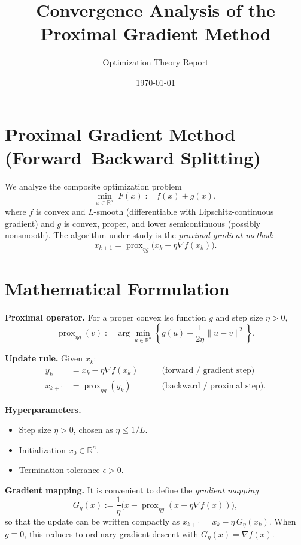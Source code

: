 \documentclass[11pt]{article}
\title{Convergence Analysis of the Proximal Gradient Method}
\author{Optimization Theory Report}
\date{\today}
\begin{document}
\maketitle

\section*{Proximal Gradient Method (Forward--Backward Splitting)}

We analyze the composite optimization problem
\[
\min_{x \in \mathbb{R}^n} \; F(x) := f(x) + g(x),
\]
where $f$ is convex and $L$-smooth (differentiable with Lipschitz-continuous gradient) and $g$ is convex, proper, and lower semicontinuous (possibly nonsmooth). The algorithm under study is the \emph{proximal gradient method}:
\[
x_{k+1} = \operatorname{prox}_{\eta g}\bigl(x_k - \eta \nabla f(x_k)\bigr).
\]

\section*{Mathematical Formulation}

\textbf{Proximal operator.} For a proper convex lsc function $g$ and step size $\eta > 0$,
\[
\operatorname{prox}_{\eta g}(v) := \arg\min_{u \in \mathbb{R}^n} \left\{ g(u) + \frac{1}{2\eta}\|u - v\|^2 \right\}.
\]

\textbf{Update rule.} Given $x_k$:
\begin{align}
y_k &= x_k - \eta \nabla f(x_k) \qquad &\text{(forward / gradient step)}\\
x_{k+1} &= \operatorname{prox}_{\eta g}(y_k) \qquad &\text{(backward / proximal step)}.
\end{align}

\textbf{Hyperparameters.}
\begin{itemize}
\item Step size $\eta > 0$, chosen as $\eta \le 1/L$.
\item Initialization $x_0 \in \mathbb{R}^n$.
\item Termination tolerance $\epsilon > 0$.
\end{itemize}

\textbf{Gradient mapping.} It is convenient to define the \emph{gradient mapping}
\[
G_\eta(x) := \frac{1}{\eta}\bigl(x - \operatorname{prox}_{\eta g}(x - \eta \nabla f(x))\bigr),
\]
so that the update can be written compactly as $x_{k+1} = x_k - \eta\, G_\eta(x_k)$. When $g \equiv 0$, this reduces to ordinary gradient descent with $G_\eta(x) = \nabla f(x)$.
\end{document}
